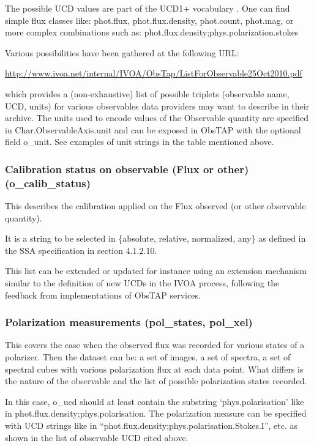 \documentclass[11pt,a4paper]{ivoa}
\begin{document}
The possible UCD values are part of the UCD1+ vocabulary \cite{2007ivoa.spec.0402P} . One can find simple flux classes
like: phot.flux, phot.flux.density, phot.count, phot.mag, or more complex combinations such as:
phot.flux.density;phys.polarization.stokes

Various possibilities have been gathered at the following URL:

\url{http://www.ivoa.net/internal/IVOA/ObsTap/ListForObservable25Oct2010.pdf}  

which provides a (non-exhaustive) list of possible triplets (observable name, UCD, units) for various observables data
providers may want to describe in their archive. The units used to encode values of the Observable quantity are
specified in Char.ObservableAxis.unit and can be exposed in ObsTAP with the optional field o\_unit. See examples of
unit strings in the table mentioned above.

\subsubsection{Calibration status on observable (Flux or other) (o\_calib\_status)}
This describes the calibration applied on the Flux observed (or other observable quantity).

It is a string to be selected in \{absolute, relative, normalized, any\} as defined in the SSA specification 
\cite{2012ivoa.spec.0210T} in section 4.1.2.10.

This list can be extended or updated for instance using an extension mechanism similar to the definition of new UCDs in
the IVOA process, following the feedback from implementations of ObsTAP services. 

\subsubsection{Polarization measurements (pol\_states, pol\_xel)}
\label{bkm:Ref482804077}\label{bkm:Ref482802717}This covers the case when the observed flux was recorded for various
states of a polarizer. Then the dataset can be: a set of images, a set of spectra, a set of spectral cubes with various
polarization flux at each data point. What differs is the nature of the observable and the list of possible
polarization states recorded.

In this case, o\_ucd should at least contain the substring `phys.polarisation' like in
{\textquotedbl}phot.flux.density;phys.polarisation{\textquotedbl}. The polarization measure can be specified with UCD
strings like in ``phot.flux.density;phys.polarisation.Stokes.I'', etc. as shown in the list of observable UCD cited
above.
\end{document}
